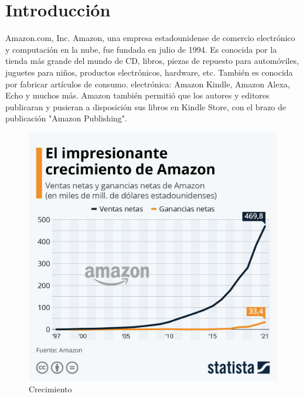 %
%

\section{Introducción}

Amazon.com, Inc. Amazon, una empresa estadounidense de comercio electrónico y computación en la nube, fue fundada en julio de 1994. Es conocida por la tienda más grande del mundo de CD, libros, piezas de repuesto para automóviles, juguetes para niños, productos electrónicos, hardware, etc. También es conocida por fabricar artículos de consumo. electrónica: Amazon Kindle, Amazon Alexa, Echo y muchos más. Amazon también permitió que los autores y editores publicaran y pusieran a disposición sus libros en Kindle Store, con el brazo de publicación "Amazon Publishing". 

\begin{figure}[h]
	\centering
	\includegraphics[scale=.2] {img/crecimiento_amazon}
	\caption{Crecimiento}
	\label{fig:1}	
\end{figure}

